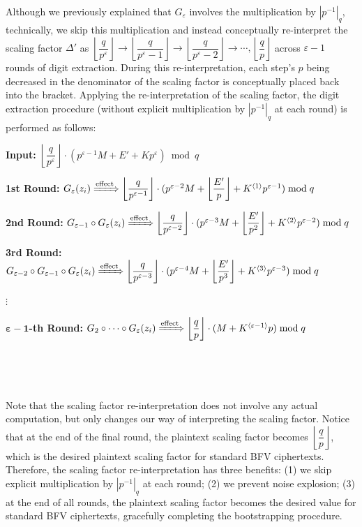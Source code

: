 $ $


 Although we previously explained that  $G_{\varepsilon}$ involves the multiplication by $|p^{-1}|_{q}$, technically, we skip this multiplication and instead conceptually re-interpret the scaling factor $\Delta'$ as $\left\lfloor\dfrac{q}{p^\varepsilon}\right\rfloor \rightarrow \left\lfloor\dfrac{q}{p^\varepsilon-1}\right\rfloor \rightarrow \left\lfloor\dfrac{q}{p^\varepsilon-2}\right\rfloor \rightarrow \cdots, \left\lfloor\dfrac{q}{p}\right\rfloor$ across $\varepsilon-1$ rounds of digit extraction. During this re-interpretation, each step's $p$ being decreased in the denominator of the scaling factor is conceptually placed back into the bracket. Applying the re-interpretation of the scaling factor, the digit extraction procedure (without explicit multiplication by $|p^{-1}|_q$ at each round) is performed as follows:


\textbf{Input:} $\left\lfloor\dfrac{q}{p^{\varepsilon}}\right\rfloor \cdot (p^{\varepsilon - 1}M + E' + Kp^{\varepsilon}) \bmod q$

\textbf{1st Round:} $G_{\varepsilon}(z_i) \xRightarrow{\text{effect}} \left\lfloor\dfrac{q}{p^{\varepsilon-1}}\right\rfloor \cdot (p^{\varepsilon - 2}M + \left\lfloor\dfrac{E'}{p}\right\rfloor + K^{\langle 1 \rangle}p^{\varepsilon-1}) \bmod q$

\textbf{2nd Round:} $G_{\varepsilon-1} \circ G_{\varepsilon}(z_i) \xRightarrow{\text{effect}} \left\lfloor\dfrac{q}{p^{\varepsilon-2}}\right\rfloor \cdot (p^{\varepsilon - 3}M + \left\lfloor\dfrac{E'}{p^2}\right\rfloor + K^{\langle 2 \rangle}p^{\varepsilon-2}) \bmod q$

\textbf{3rd Round:} $G_{\varepsilon-2} \circ G_{\varepsilon-1} \circ G_{\varepsilon}(z_i)  \xRightarrow{\text{effect}} \left\lfloor\dfrac{q}{p^{\varepsilon-3}}\right\rfloor \cdot (p^{\varepsilon - 4}M + \left\lfloor\dfrac{E'}{p^3}\right\rfloor + K^{\langle 3 \rangle}p^{\varepsilon-3}) \bmod q$

$\vdots$

\textbf{$\bm{\varepsilon - 1}$-th Round:} $G_{2}\circ \cdots \circ G_{\varepsilon} (z_i) \xRightarrow{\text{effect}} \left\lfloor\dfrac{q}{p}\right\rfloor \cdot (M + K^{\langle \varepsilon - 1 \rangle}p)  \bmod q$ 



$ $



$ $


Note that the scaling factor re-interpretation does not involve any actual computation, but only changes our way of interpreting the scaling factor. Notice that at the end of the final round, the plaintext scaling factor becomes $\left\lfloor\dfrac{q}{p}\right\rfloor$, which is the desired plaintext scaling factor for standard BFV ciphertexts. Therefore, the scaling factor re-interpretation has three benefits: (1) we skip explicit multiplication by $|p^{-1}|_q$ at each round; (2) we prevent noise explosion; (3) at the end of all rounds, the plaintext scaling factor becomes the desired value for standard BFV ciphertexts, gracefully completing the bootstrapping procedure. 

